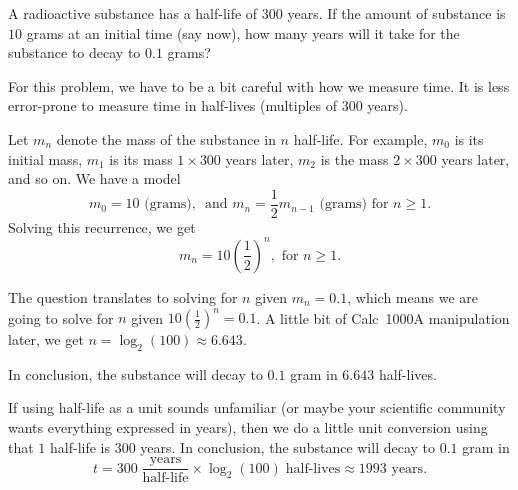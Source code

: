\documentclass[../main.tex]{subfiles}
\begin{document}
\begin{exercise}
  A radioactive substance has a half-life of \(300\) years.   If the amount of substance is \(10\) grams at an initial time (say now), how many years will it take for the substance to decay to \(0.1\) grams?

  \begin{solution}
    For this problem, we have to be a bit careful with how we measure time. It is less error-prone to measure time in half-lives (multiples of \(300\) years). 

    Let \(m_{n}\) denote the mass of the substance in \(n\) half-life.  For example, \(m_{0}\) is its initial mass, \(m_{1}\) is its mass \(1 \times 300\) years later, \(m_{2}\) is the mass \(2 \times 300\) years later, and so on.  We have a model
    \[
      m_{0} = 10 \text{ (grams), } \text{ and } m_{n} = \frac{1}{2} m_{n-1} \text{ (grams) for \(n \ge 1\).}
    \]
    Solving this recurrence, we get
    \[
      m_{n} = 10 \left( \frac{1}{2} \right)^{n}, \text{ for } n \ge 1.
    \]

    The question translates to solving for \(n\) given \(m_{n} = 0.1\), which means we are going to solve for \(n\) given \(10 \left( \frac{1}{2} \right)^{n} = 0.1\).  A little bit of Calc~1000A manipulation later, we get \(n = \log_{2}(100) \approx 6.643\).

    In conclusion, the substance will decay to \(0.1\) gram in \(6.643\) half-lives. 

    If using half-life as a unit sounds unfamiliar (or maybe your scientific community wants everything expressed in years), then we do a little unit conversion using that \(1\) half-life is \(300\) years.  In conclusion, the substance will decay to \(0.1\) gram in
    \[
      t = 300 \; \frac{\text{years}}{\text{half-life}} \times \log_{2}(100)\; \text{half-lives} \approx 1993 \text{ years}.
    \]

  \end{solution}
\end{exercise}
\end{document}
